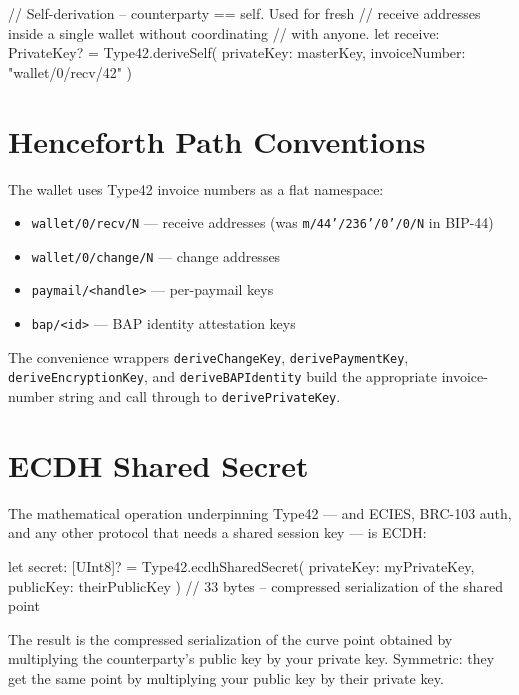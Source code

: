\documentclass[a4paper, 11pt, openany]{book}
\begin{document}
\begin{forthbox}
// Self-derivation -- counterparty == self. Used for fresh
// receive addresses inside a single wallet without coordinating
// with anyone.
let receive: PrivateKey? = Type42.deriveSelf(
    privateKey: masterKey,
    invoiceNumber: "wallet/0/recv/42"
)
\end{forthbox}

\section{Henceforth Path Conventions}

The wallet uses Type42 invoice numbers as a flat namespace:

\begin{itemize}
\item \texttt{wallet/0/recv/N} --- receive addresses (was \texttt{m/44'/236'/0'/0/N} in BIP-44)
\item \texttt{wallet/0/change/N} --- change addresses
\item \texttt{paymail/<handle>} --- per-paymail keys
\item \texttt{bap/<id>} --- BAP identity attestation keys
\end{itemize}

The convenience wrappers \texttt{deriveChangeKey}, \texttt{derivePaymentKey}, \texttt{deriveEncryptionKey}, and \texttt{deriveBAPIdentity} build the appropriate invoice-number string and call through to \texttt{derivePrivateKey}.

\section{ECDH Shared Secret}

The mathematical operation underpinning Type42 --- and ECIES, BRC-103 auth, and any other protocol that needs a shared session key --- is ECDH:

\begin{forthbox}
let secret: [UInt8]? = Type42.ecdhSharedSecret(
    privateKey: myPrivateKey,
    publicKey: theirPublicKey
)
// 33 bytes -- compressed serialization of the shared point
\end{forthbox}

The result is the compressed serialization of the curve point obtained by multiplying the counterparty's public key by your private key. Symmetric: they get the same point by multiplying your public key by their private key.
\end{document}
